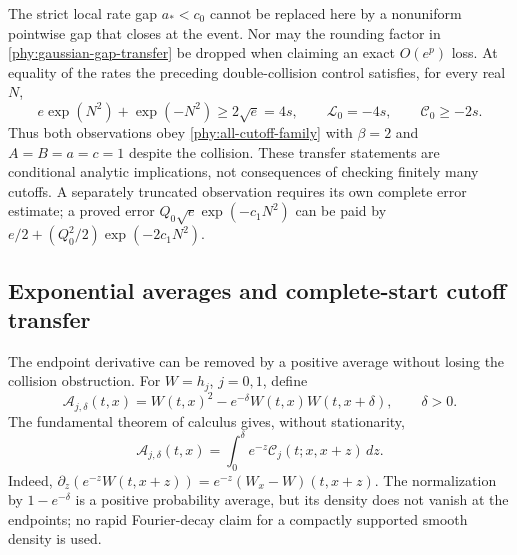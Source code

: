 \documentclass[11pt]{article}
\numberwithin{equation}{section}
\theoremstyle{definition}
\theoremstyle{remark}
\begin{document}
The strict local rate gap $a_*<c_0$ cannot be replaced here by a
nonuniform pointwise gap that closes at the event.  Nor may the
rounding factor in \eqref{phy:gaussian-gap-transfer} be dropped when
claiming an exact $O(e^p)$ loss.  At equality of the rates the preceding
double-collision control satisfies, for every real $N$,
\[
 e\exp(N^2)+\exp(-N^2)\ge2\sqrt e=4s,
 \qquad \mathcal L_0=-4s,\qquad \mathcal C_0\ge-2s.
\]
Thus both observations obey \eqref{phy:all-cutoff-family} with
$\beta=2$ and $A=B=a=c=1$ despite the collision.  These transfer
statements are conditional analytic implications, not consequences of
checking finitely many cutoffs.  A separately truncated observation
requires its own complete error estimate; a proved error
$Q_0\sqrt e\exp(-c_1N^2)$ can be paid by
$e/2+(Q_0^2/2)\exp(-2c_1N^2)$.

\subsection{Exponential averages and complete-start cutoff transfer}
\label{obs:exponential-average}

The endpoint derivative can be removed by a positive average without
losing the collision obstruction.  For $W=h_j$, $j=0,1$, define
\begin{equation}
 \mathcal A_{j,\delta}(t,x)
 =W(t,x)^2-e^{-\delta}W(t,x)W(t,x+\delta),\qquad \delta>0.
 \label{obs:average-definition}
\end{equation}
The fundamental theorem of calculus gives, without stationarity,
\begin{equation}
 \mathcal A_{j,\delta}(t,x)
 =\int_0^\delta e^{-z}\mathcal C_j(t;x,x+z)\,dz.
 \label{obs:average-identity}
\end{equation}
Indeed, $\partial_z(e^{-z}W(t,x+z))=e^{-z}(W_x-W)(t,x+z)$.
The normalization by $1-e^{-\delta}$ is a positive probability
average, but its density does not vanish at the endpoints; no rapid
Fourier-decay claim for a compactly supported smooth density is used.
\end{document}
